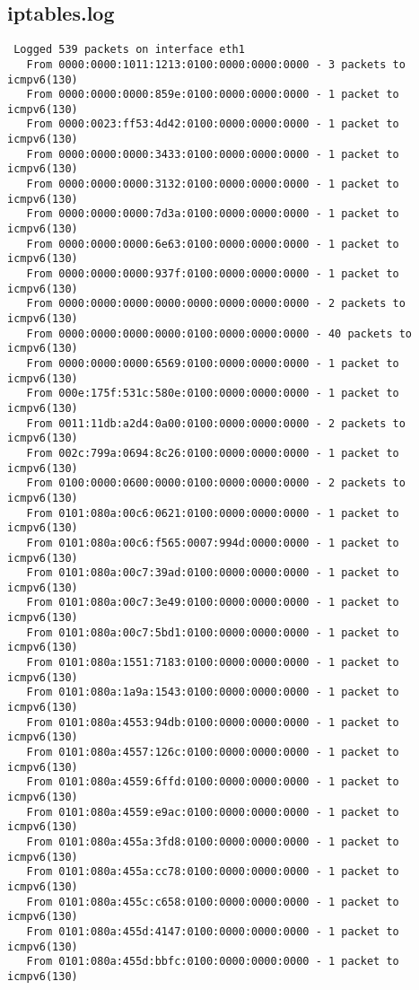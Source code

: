 \subsection{iptables.log}
\label{subsec:iptables.log}
\begin{lstlisting}
 Logged 539 packets on interface eth1
   From 0000:0000:1011:1213:0100:0000:0000:0000 - 3 packets to icmpv6(130)
   From 0000:0000:0000:859e:0100:0000:0000:0000 - 1 packet to icmpv6(130)
   From 0000:0023:ff53:4d42:0100:0000:0000:0000 - 1 packet to icmpv6(130)
   From 0000:0000:0000:3433:0100:0000:0000:0000 - 1 packet to icmpv6(130)
   From 0000:0000:0000:3132:0100:0000:0000:0000 - 1 packet to icmpv6(130)
   From 0000:0000:0000:7d3a:0100:0000:0000:0000 - 1 packet to icmpv6(130)
   From 0000:0000:0000:6e63:0100:0000:0000:0000 - 1 packet to icmpv6(130)
   From 0000:0000:0000:937f:0100:0000:0000:0000 - 1 packet to icmpv6(130)
   From 0000:0000:0000:0000:0000:0000:0000:0000 - 2 packets to icmpv6(130)
   From 0000:0000:0000:0000:0100:0000:0000:0000 - 40 packets to icmpv6(130)
   From 0000:0000:0000:6569:0100:0000:0000:0000 - 1 packet to icmpv6(130)
   From 000e:175f:531c:580e:0100:0000:0000:0000 - 1 packet to icmpv6(130)
   From 0011:11db:a2d4:0a00:0100:0000:0000:0000 - 2 packets to icmpv6(130)
   From 002c:799a:0694:8c26:0100:0000:0000:0000 - 1 packet to icmpv6(130)
   From 0100:0000:0600:0000:0100:0000:0000:0000 - 2 packets to icmpv6(130)
   From 0101:080a:00c6:0621:0100:0000:0000:0000 - 1 packet to icmpv6(130)
   From 0101:080a:00c6:f565:0007:994d:0000:0000 - 1 packet to icmpv6(130)
   From 0101:080a:00c7:39ad:0100:0000:0000:0000 - 1 packet to icmpv6(130)
   From 0101:080a:00c7:3e49:0100:0000:0000:0000 - 1 packet to icmpv6(130)
   From 0101:080a:00c7:5bd1:0100:0000:0000:0000 - 1 packet to icmpv6(130)
   From 0101:080a:1551:7183:0100:0000:0000:0000 - 1 packet to icmpv6(130)
   From 0101:080a:1a9a:1543:0100:0000:0000:0000 - 1 packet to icmpv6(130)
   From 0101:080a:4553:94db:0100:0000:0000:0000 - 1 packet to icmpv6(130)
   From 0101:080a:4557:126c:0100:0000:0000:0000 - 1 packet to icmpv6(130)
   From 0101:080a:4559:6ffd:0100:0000:0000:0000 - 1 packet to icmpv6(130)
   From 0101:080a:4559:e9ac:0100:0000:0000:0000 - 1 packet to icmpv6(130)
   From 0101:080a:455a:3fd8:0100:0000:0000:0000 - 1 packet to icmpv6(130)
   From 0101:080a:455a:cc78:0100:0000:0000:0000 - 1 packet to icmpv6(130)
   From 0101:080a:455c:c658:0100:0000:0000:0000 - 1 packet to icmpv6(130)
   From 0101:080a:455d:4147:0100:0000:0000:0000 - 1 packet to icmpv6(130)
   From 0101:080a:455d:bbfc:0100:0000:0000:0000 - 1 packet to icmpv6(130)

\end{lstlisting}
